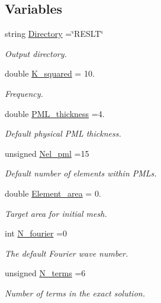 \subsection*{Variables}
\begin{DoxyCompactItemize}
\item 
string \hyperlink{namespaceProblemParameters_a9df0f1728e8e7e53dcca84385ae9a031}{Directory} =\char`\"{}R\+E\+S\+LT\char`\"{}
\begin{DoxyCompactList}\small\item\em Output directory. \end{DoxyCompactList}\item 
double \hyperlink{namespaceProblemParameters_aa5362de1af9e257fde4317c367158a93}{K\+\_\+squared} = 10.
\begin{DoxyCompactList}\small\item\em Frequency. \end{DoxyCompactList}\item 
double \hyperlink{namespaceProblemParameters_ad56d4d5946cbe68de28413e4f8aa4d42}{P\+M\+L\+\_\+thickness} =4.
\begin{DoxyCompactList}\small\item\em Default physical P\+ML thickness. \end{DoxyCompactList}\item 
unsigned \hyperlink{namespaceProblemParameters_aef2e7cb819b8c5012a0f2db03892ee87}{Nel\+\_\+pml} =15
\begin{DoxyCompactList}\small\item\em Default number of elements within P\+M\+Ls. \end{DoxyCompactList}\item 
double \hyperlink{namespaceProblemParameters_aafe26abadfce87800a6a4676f0476956}{Element\+\_\+area} = 0.
\begin{DoxyCompactList}\small\item\em Target area for initial mesh. \end{DoxyCompactList}\item 
int \hyperlink{namespaceProblemParameters_aaa674958a1ca6ee0b99de3377288c93f}{N\+\_\+fourier} =0
\begin{DoxyCompactList}\small\item\em The default Fourier wave number. \end{DoxyCompactList}\item 
unsigned \hyperlink{namespaceProblemParameters_a6361f0f1c4a120e62d28db64baa84b40}{N\+\_\+terms} =6
\begin{DoxyCompactList}\small\item\em Number of terms in the exact solution. \end{DoxyCompactList}\item 

\end{DoxyCompactItemize}
